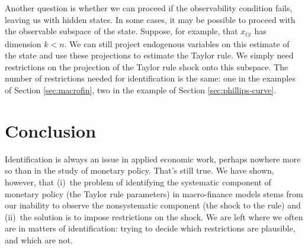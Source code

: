 \documentclass[12pt]{article}
\begin{document}
{Another question is whether we can proceed if the observability condition fails,
leaving us with hidden states.
In some cases, it may be possible to proceed with the observable subspace of the state.
Suppose, for example, that $x_{t|t}$ has dimension $k < n$.
We can still project endogenous variables on this estimate of the state
and use these projections to estimate the Taylor rule.
We simply need restrictions on the projection of the Taylor rule shock
onto this subspace.
The number of restrictions needed for identification is the same:
one in the examples of Section \ref{sec:macrofin}, two in the example of Section \ref{sec:phillips-curve}.

\begin{comment}
\begin{itemize}
\item Bernanke and Blinder (1992, p 902):
``Two types of identifying assumptions are most obvious.
[The first] means assuming that there is no feedback from the economy
to policy actions within the period. ...
[The second] is to suppose ... that policy actions affect real variables
only with a lag.''

\item Bernanke and Mihov (1998, p 874):
``[I]t is sufficient to assume that policy shocks do not affect
the given macro variables within the current period.''

\item Sims (1998, p 933):
``A reasonable picture of the effects of monetary policy shifts
emerges only under the identifying assumptions of delay in the reaction
of certain `sluggish' private sector variables to monetary policy shifts.''
\end{itemize}

These are zeros in the dependence of some variables on the state
(the current and lagged values of all the variables in the system),
so they fit into our framework.
But some concern the policy shock, others concern the behavior
of other variables.

\end{comment}



\section{Conclusion}

Identification is always an issue in applied economic work,
perhaps nowhere more so than in the study of monetary policy.
That's still true.
We have shown, however, that
(i)~the problem of identifying
the systematic component of monetary policy (the Taylor rule parameters)
in macro-finance models stems from our inability to observe the nonsystematic component
(the shock to the rule)
and (ii)~the solution is to impose restrictions on the shock.
We are left where we often are in matters of identification:
trying to decide which restrictions are plausible,
and which are not.


}
\end{document}
